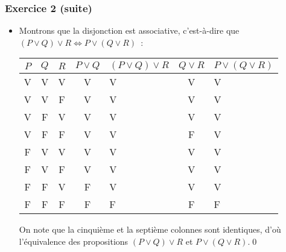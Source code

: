 \documentclass[10pt,notheorems]{beamer}
\theoremstyle{plain}
\theoremstyle{definition} %
\begin{document}
\begin{frame}
  \frametitle{Exercice 2 (suite)}
  \fontsize{8}{10}\selectfont

  \begin{itemize}
    
  \item Montrons que la disjonction est associative, c'est-à-dire que $(P\lor Q)\lor R \Leftrightarrow P\lor (Q\lor R)$~:\newline
    \begin{table}[H]
      \centering
      \begin{tabular}[H]{|ccc|cgcg|}
        \hline
        $P$ & $Q$ & $R$ & $P\lor Q$ & $(P\lor Q)\lor R$ & $Q\lor R$ & $P \lor (Q \lor R)$ \\ \hline
        V & V & V & V & V & V & V\\
        V & V & F & V & V & V & V\\
        V & F & V & V & V & V & V\\
        V & F & F & V & V & F & V\\
        F & V & V & V & V & V & V\\
        F & V & F & V & V & V & V\\
        F & F & V & F & V & V & V\\
        F & F & F & F & F & F & F\\
        \hline\hline
      \end{tabular}
    \end{table}

    \bigskip
    
    On note que la cinquième et la septième colonnes sont identiques, d'où
    l'équivalence des propositions $(P\lor Q)\lor R$ et $P\lor (Q\lor R)$.\qed\newline
    
  \end{itemize}
  
\end{frame}
\end{document}
